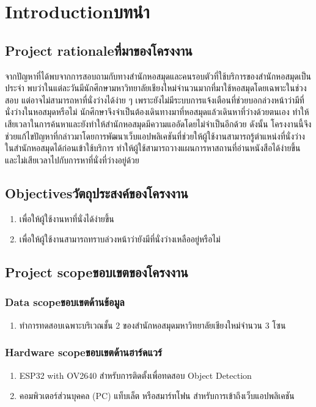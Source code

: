 \chapter{\ifenglish Introduction\else บทนำ\fi}

\section{\ifenglish Project rationale\else ที่มาของโครงงาน\fi}
จากปัญหาที่ได้พบจากการสอบถามกับทางสำนักหอสมุดและคนรอบตัวที่ใช้บริการของสำนักหอสมุดเป็นประจำ พบว่าในแต่ละวันมีนักศึกษามหาวิทยาลัยเชียงใหม่จำนวนมากที่มาใช้หอสมุดโดยเฉพาะในช่วงสอบ แต่อาจไม่สามารถหาที่นั่งว่างได้ง่าย ๆ 
เพราะยังไม่มีระบบการแจ้งเตือนที่ช่วยบอกล่วงหน้าว่ามีที่นั่งว่างในหอสมุดหรือไม่ นักศึกษาจึงจำเป็นต้องเดินทางมาที่หอสมุดแล้วเดินหาที่ว่างด้วยตนเอง ทำให้เสียเวลาในการค้นหาและยังทำให้สำนักหอสมุดมีความแออัดโดยไม่จำเป็นอีกด้วย
ดังนั้น โครงงานนี้จึงช่วยแก้ไขปัญหาที่กล่าวมาโดยการพัฒนาเว็บแอปพลิเคชันที่ช่วยให้ผู้ใช้งานสามารถรู้ตำแหน่งที่นั่งว่างในสำนักหอสมุดได้ก่อนเข้าใช้บริการ ทำให้ผู้ใช้สามารถวางแผนการหาสถานที่อ่านหนังสือได้ง่ายขึ้น 
และไม่เสียเวลาไปกับการหาที่นั่งที่ว่างอยู่ด้วย
\section{\ifenglish Objectives\else วัตถุประสงค์ของโครงงาน\fi}
\begin{enumerate}
    \item เพื่อให้ผู้ใช้งานหาที่นั่งได้ง่ายขึ้น
    \item เพื่อให้ผู้ใช้งานสามารถทราบล่วงหน้าว่ายังมีที่นั่งว่างเหลืออยู่หรือไม่
\end{enumerate}

\section{\ifenglish Project scope\else ขอบเขตของโครงงาน\fi}

\subsection{\ifenglish Data scope\else ขอบเขตด้านข้อมูล\fi}
\begin{enumerate}
    \item ทำการทดสอบเฉพาะบริเวณชั้น 2 ของสำนักหอสมุดมหาวิทยาลัยเชียงใหม่จำนวน 3 โซน
\end{enumerate}
\subsection{\ifenglish Hardware scope\else ขอบเขตด้านฮาร์ดแวร์\fi}
\begin{enumerate}
    \item ESP32 with OV2640 สำหรับการติดตั้งเพื่อทดสอบ Object Detection
    \item คอมพิวเตอร์ส่วนบุคคล (PC) แท็บเล็ต หรือสมาร์ทโฟน สําหรับการเข้าถึงเว็บแอปพลิเคชัน
\end{enumerate}
